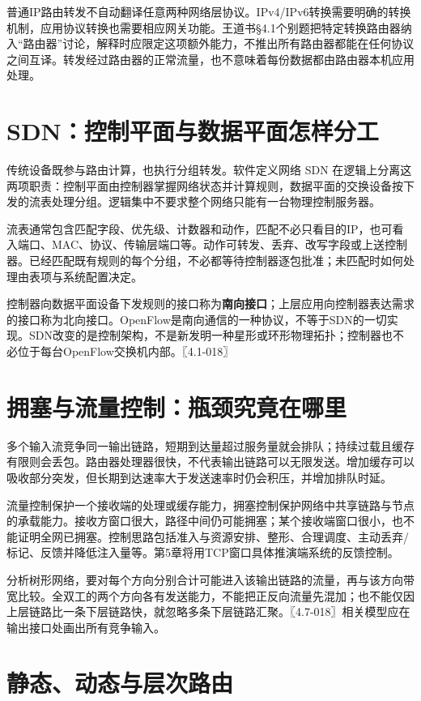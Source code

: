 普通IP路由转发不自动翻译任意两种网络层协议。IPv4/IPv6转换需要明确的转换机制，应用协议转换也需要相应网关功能。王道书§4.1个别题把特定转换路由器纳入``路由器''讨论，解释时应限定这项额外能力，不推出所有路由器都能在任何协议之间互译。转发经过路由器的正常流量，也不意味着每份数据都由路由器本机应用处理。

\section{SDN：控制平面与数据平面怎样分工}\label{cn-04-02}

传统设备既参与路由计算，也执行分组转发。软件定义网络 SDN 在逻辑上分离这两项职责：控制平面由控制器掌握网络状态并计算规则，数据平面的交换设备按下发的流表处理分组。逻辑集中不要求整个网络只能有一台物理控制服务器。

流表通常包含匹配字段、优先级、计数器和动作，匹配不必只看目的IP，也可看入端口、MAC、协议、传输层端口等。动作可转发、丢弃、改写字段或上送控制器。已经匹配既有规则的每个分组，不必都等待控制器逐包批准；未匹配时如何处理由表项与系统配置决定。

控制器向数据平面设备下发规则的接口称为\textbf{南向接口}；上层应用向控制器表达需求的接口称为北向接口。OpenFlow是南向通信的一种协议，不等于SDN的一切实现。SDN改变的是控制架构，不是新发明一种星形或环形物理拓扑；控制器也不必位于每台OpenFlow交换机内部。〖4.1-018〗

\section{拥塞与流量控制：瓶颈究竟在哪里}\label{cn-04-03}

多个输入流竞争同一输出链路，短期到达量超过服务量就会排队；持续过载且缓存有限则会丢包。路由器处理器很快，不代表输出链路可以无限发送。增加缓存可以吸收部分突发，但长期到达速率大于发送速率时仍会积压，并增加排队时延。

流量控制保护一个接收端的处理或缓存能力，拥塞控制保护网络中共享链路与节点的承载能力。接收方窗口很大，路径中间仍可能拥塞；某个接收端窗口很小，也不能证明全网已拥塞。控制思路包括准入与资源安排、整形、合理调度、主动丢弃/标记、反馈并降低注入量等。第5章将用TCP窗口具体推演端系统的反馈控制。

分析树形网络，要对每个方向分别合计可能进入该输出链路的流量，再与该方向带宽比较。全双工的两个方向各有发送能力，不能把正反向流量先混加；也不能仅因上层链路比一条下层链路快，就忽略多条下层链路汇聚。〖4.7-018〗相关模型应在输出接口处画出所有竞争输入。

\section{静态、动态与层次路由}\label{cn-04-04}

